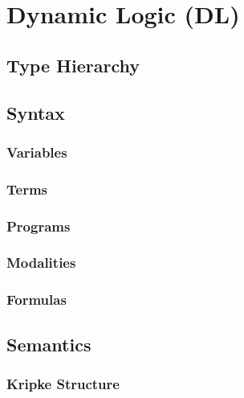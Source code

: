 \documentclass[a4paper, 11pt, accentcolor = tud3b]{tudreport}
\begin{document}
	\chapter{Dynamic Logic (DL)} %
		\label{c:dl}
	

		\section{Type Hierarchy} %

		\section{Syntax} %

			\subsection{Variables} %

			\subsection{Terms} %

			\subsection{Programs} %

			\subsection{Modalities} %

			\subsection{Formulas} %

		\section{Semantics} %

			\subsection{Kripke Structure} %
\end{document}
